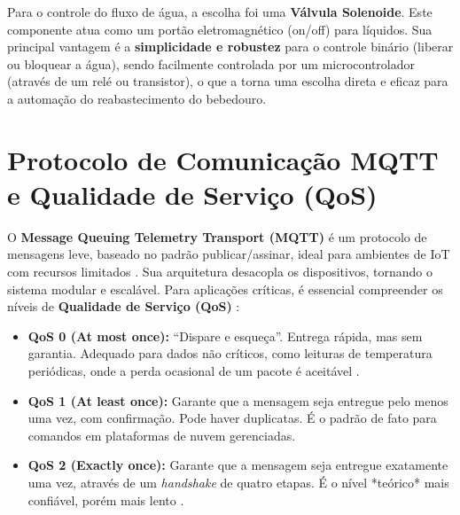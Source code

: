 Para o controle do fluxo de água, a escolha foi uma \textbf{Válvula Solenoide}. Este componente atua como um portão eletromagnético (on/off) para líquidos. Sua principal vantagem é a \textbf{simplicidade e robustez} para o controle binário (liberar ou bloquear a água), sendo facilmente controlada por um microcontrolador (através de um relé ou transistor), o que a torna uma escolha direta e eficaz para a automação do reabastecimento do bebedouro.



\section{Protocolo de Comunicação MQTT e Qualidade de Serviço (QoS)}

O \textbf{Message Queuing Telemetry Transport (MQTT)} é um protocolo de mensagens leve, baseado no padrão publicar/assinar, ideal para ambientes de IoT com recursos limitados \cite{rodrigues2019, mqtt_aws}.
Sua arquitetura desacopla os dispositivos, tornando o sistema modular e escalável.
Para aplicações críticas, é essencial compreender os níveis de \textbf{Qualidade de Serviço (QoS)} \cite{mqtt_qos_bevywise}:
\begin{itemize}
    \item \textbf{QoS 0 (At most once):} ``Dispare e esqueça''.
Entrega rápida, mas sem garantia. Adequado para dados não críticos, como leituras de temperatura periódicas, onde a perda ocasional de um pacote é aceitável \cite{mqtt_qos_cedalo}.
\item \textbf{QoS 1 (At least once):} Garante que a mensagem seja entregue pelo menos uma vez, com confirmação.
Pode haver duplicatas. É o padrão de fato para comandos em plataformas de nuvem gerenciadas.
\item \textbf{QoS 2 (Exactly once):} Garante que a mensagem seja entregue exatamente uma vez, através de um \textit{handshake} de quatro etapas.
É o nível *teórico* mais confiável, porém mais lento \cite{mqtt_qos_bevywise, mqtt_qos_thingsboard}.
\end{itemize}

